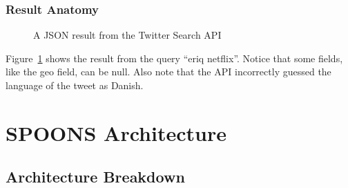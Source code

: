 \documentclass[12pt]{ucthesis}
\newcommand{\captionfonts}{\small\bf\ssp}
\begin{document}
\section{Result Anatomy}
\begin{figure}
   \begin{center}
      \captionfonts
      \caption[Twitter Search API Result]{A JSON result from the Twitter Search API}
      \label{fig:apiRes}
   \end{center}
\end{figure}

Figure~\ref{fig:apiRes} shows the result from the query ``eriq netflix''. Notice that some fields,
like the \textsf{geo} field, can be null. Also note that the API incorrectly guessed the language of the tweet as Danish.




\part{SPOONS Architecture}
\label{arch}

\chapter{Architecture Breakdown}
\label{arch-breakdown}
\end{document}
